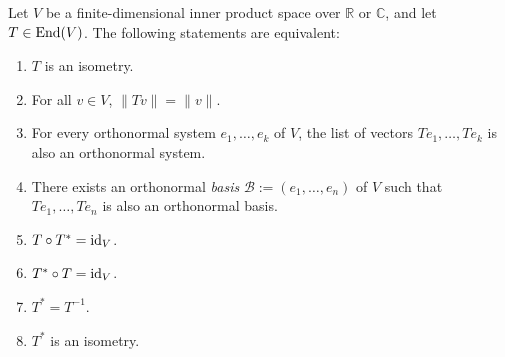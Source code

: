\begin{theorem}
\label{thm:isometry_equivalences}
Let $V$ be a finite-di\-men\-sional inner product space over $\mathbb{R}$ or $\mathbb{C}$, and let $T \in \operatorname{End}(V)$. The following statements are equivalent:
\begin{enumerate}
    \item $T$ is an isometry.
    \item For all $v \in V$, $\|Tv\| = \|v\|$.
    \item For every orthonormal system $e_1, \dots, e_k$ of $V$, the list of vectors $Te_1, \dots, Te_k$ is also an orthonormal system.
    \item There exists an orthonormal \emph{basis} $\mathcal{B} := (e_1, \dots, e_n)$ of $V$ such that $Te_1, \dots, Te_n$ is also an orthonormal basis.
    \item $T \circ T^* = \operatorname{id}_V$.
    \item $T^* \circ T = \operatorname{id}_V$.
    \item $T^* = T^{-1}$.
    \item $T^*$ is an isometry.
\end{enumerate}
\end{theorem}

